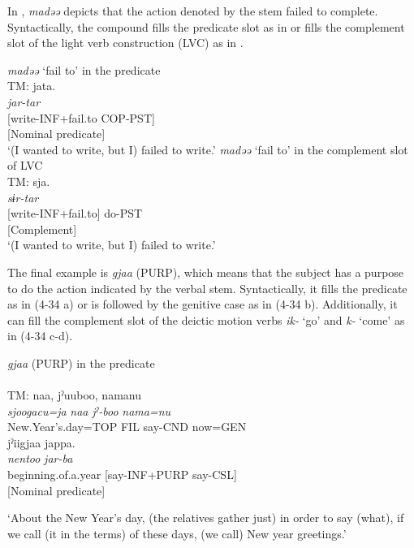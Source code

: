 \begin{exe}
\begin{xlist}
In , \textit{madəə} depicts that the action denoted by the stem failed to complete. Syntactically, the compound fills the predicate slot as in  or fills the complement slot of the light verb construction (LVC) as in .

\ea \label{ex:4.33}
\ea \textit{madəə} ‘fail to’ in the predicate\hfill\relax[El: 111105]\\\label{ex:4.33a}
TM:  {jata.}\\
  {\itshape jar-tar}\\
 {[write-INF+fail.to} {COP-PST]}\\
 {[Nominal predicate]}\\
\glt{} ‘(I wanted to write, but I) failed to write.’
\ex \textit{madəə} ‘fail to’ in the complement slot of LVC\hfill\relax[El: 111105]\\\label{ex:4.33b}
{TM:}  {sja.}\\
  {\itshape sɨr-tar}\\
 {[write-INF+fail.to]} {do-PST}\\
 {[Complement]}\\
\glt{} ‘(I wanted to write, but I) failed to write.’
\z
\z


The final example is \textit{gjaa} (PURP), which means that the subject has a purpose to do the action indicated by the verbal stem. Syntactically, it fills the predicate as in (4-34 a) or is followed by the genitive case as in (4-34 b). Additionally, it can fill the complement slot of the deictic motion verbs \textit{ik-} ‘go’ and \textit{k-} ‘come’ as in (4-34 c-d).

\ea\label{ex:4.34}
\ea\label{ex:4.34a} \textit{gjaa} (PURP) in the predicate\hfill\relax[Co: 111113\_01.txt]\\
 \\
 {TM:}  {naa,} {jˀuuboo,} {namanu}\\ 
  {\itshape sjoogacu=ja} {\itshape naa} {\itshape jˀ-boo}  {\itshape nama=nu}\\ 
  {New.Year’s.day=TOP} {FIL} {say-CND} {now=GEN}\\ 
    {jˀiigjaa} {jappa.}\\
{\itshape nentoo}  {\itshape jar-ba}\\
{beginning.of.a.year} {[say-INF+PURP} {say-CSL]}\\
   {[Nominal predicate]}\\
  \glt{} \parbox{\linewidth-\widthof{TM:}}{‘About the New Year’s day, (the relatives gather just) in order to say (what), if we call (it in the terms) of these days, (we call) New year greetings.’}
  

\end{xlist}
\end{exe}
